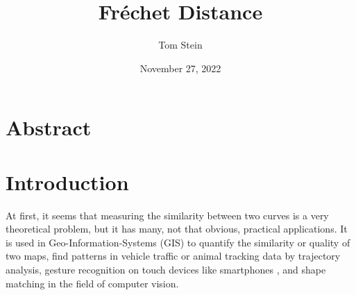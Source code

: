 \documentclass[
oneside,
fontsize=11pt
]{scrartcl}
\title{Fréchet Distance}
\author{Tom Stein}
\date{November 27, 2022}
\begin{document}


%






\newpage

 


\section*{Abstract}


\section{Introduction}
At first, it seems that measuring the similarity between two curves
is a very theoretical problem, but it has many, not that obvious, practical applications.
It is used in Geo-Information-Systems (GIS) to 
quantify the similarity or quality of two maps, %
find patterns in vehicle traffic or animal tracking data 
by trajectory analysis, %
gesture recognition on touch devices like smartphones \cite{hu_research_2022}, %
and shape matching in the field of computer vision. 
\end{document}
